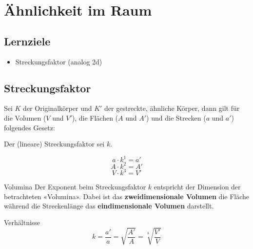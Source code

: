 \section{Ähnlichkeit im Raum}
\sectuntertitel{}


\subsection*{Lernziele}
\begin{itemize}
\item Streckungsfaktor (analog 2d)
\end{itemize}


\subsection{Streckungsfaktor}

Sei $K$ der Originalkörper und $K'$ der gestreckte, ähnliche Körper, dann gilt
für die Volumen ($V$ und $V'$), die Flächen ($A$ und $A'$) und
die Strecken ($a$ und $a'$) folgendes Gesetz:

\begin{gesetz}{}{}
  Der (lineare) Streckungsfaktor sei $k$.

  $$a \cdot{} k^1 = a'$$
  $$A \cdot{} k^2 = A'$$
  $$V \cdot{} k^3 = V'$$
\end{gesetz}

\begin{bemerkung}{Volumina}{}
Der Exponent beim Streckungsfaktor $k$ entspricht der Dimension der
betrachteten «Volumina». Dabei ist das \textbf{zweidimensionale Volumen} die
Fläche während die Streckenlänge das \textbf{eindimensionale Volumen} darstellt.
\end{bemerkung}

\begin{bemerkung}{Verhältnisse}{}
  $$k = \frac{a'}{a} = \sqrt{\frac{A'}{A}} = \sqrt[3\,\,\,]{\frac{V'}{V}}$$
\end{bemerkung}

  
\newpage
